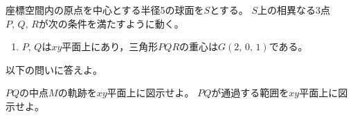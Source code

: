\documentclass[../../main.tex]{subfiles}
\begin{document}
座標空間内の原点を中心とする半径5の球面を$S$とする。
$S$上の相異なる3点$P, \, Q, \, R$が次の条件を満たすように動く。
\begin{enumerate}
  \item[条件：]$P, \, Q$は$xy$平面上にあり，三角形$PQR$の重心は$G(2, \, 0, \,1)$である。
\end{enumerate}
以下の問いに答えよ。
\begin{enumerate}
  $PQ$の中点$M$の軌跡を$xy$平面上に図示せよ。
  $PQ$が通過する範囲を$xy$平面上に図示せよ。
\end{enumerate}
\end{document}
